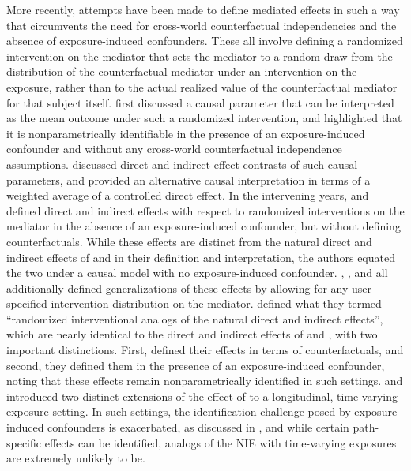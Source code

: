 \documentclass[12pt]{article}
\begin{document}
More recently, attempts have been made to define mediated effects in such a way that circumvents the need for %
cross-world counterfactual independencies and the absence of exposure-induced confounders. These all involve defining a randomized intervention on the mediator that sets the mediator to a random draw from the distribution of the counterfactual mediator under an intervention on the exposure, rather than to the actual realized value of the counterfactual mediator for that subject itself. \cite{robins2003semantics} first discussed a causal parameter that can be interpreted as the mean outcome under such a randomized intervention, and highlighted that it is nonparametrically identifiable in the presence of an exposure-induced confounder and without any cross-world counterfactual independence assumptions. \cite{van2008direct} discussed direct and indirect effect contrasts of such causal parameters, and provided an alternative causal interpretation in terms of a weighted average of a controlled direct effect. In the intervening years, \cite{didelez2006direct} and \cite{geneletti2007identifying} %
defined direct and indirect effects with respect to randomized interventions on the mediator in the absence of an exposure-induced confounder, but without defining counterfactuals. While these effects are distinct from the natural direct and indirect effects of \cite{robins1992identifiability} and \cite{pearl2001direct} in their definition and interpretation, the authors equated the two under a causal model with no exposure-induced confounder. \cite{didelez2006direct}, \cite{geneletti2007identifying}, and \cite{van2008direct} all additionally defined generalizations of these effects by allowing for any user-specified intervention distribution on the mediator. \cite{vanderweele2014effect} defined what they termed ``randomized interventional analogs of the natural direct and indirect effects'', which are nearly identical to the direct and indirect effects of \cite{didelez2006direct} and \cite{geneletti2007identifying}, with two important distinctions. First, \cite{vanderweele2014effect} defined their effects in terms of counterfactuals, and second, they defined them in the presence of an exposure-induced confounder, noting that these effects remain nonparametrically identified in such settings. \cite{vanderweele2017mediation} and \cite{zheng2017longitudinal} introduced two distinct extensions of the effect of \cite{vanderweele2014effect} to a longitudinal, time-varying exposure setting. In such settings, the identification challenge posed by exposure-induced confounders is exacerbated, as discussed in \cite{shpitser2013counterfactual}, and while certain path-specific effects can be identified, %
analogs of the NIE with time-varying exposures are extremely unlikely to be.
\end{document}
